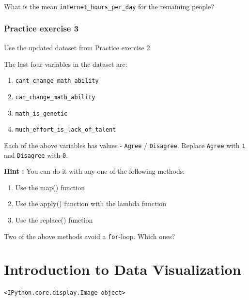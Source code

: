 \documentclass[
  letterpaper,
  DIV=11,
  numbers=noendperiod]{scrreprt}
\begin{document}
What is the mean \texttt{internet\_hours\_per\_day} for the remaining
people?

\hypertarget{practice-exercise-3-2}{%
\subsection{Practice exercise 3}\label{practice-exercise-3-2}}

\hypertarget{section-38}{%
\subsubsection{}\label{section-38}}

Use the updated dataset from Practice exercise 2.

The last four variables in the dataset are:

\begin{enumerate}
\def\labelenumi{\arabic{enumi}.}
\item
  \texttt{cant\_change\_math\_ability}
\item
  \texttt{can\_change\_math\_ability}
\item
  \texttt{math\_is\_genetic}
\item
  \texttt{much\_effort\_is\_lack\_of\_talent}
\end{enumerate}

Each of the above variables has values - \texttt{Agree} /
\texttt{Disagree}. Replace \texttt{Agree} with \texttt{1} and
\texttt{Disagree} with \texttt{0}.

\textbf{Hint :} You can do it with any one of the following methods:

\begin{enumerate}
\def\labelenumi{\arabic{enumi}.}
\item
  Use the map() function
\item
  Use the apply() function with the lambda function
\item
  Use the replace() function
\end{enumerate}

Two of the above methods avoid a \texttt{for}-loop. Which ones?

\hypertarget{introduction-to-data-visualization}{%
\chapter{Introduction to Data
Visualization}\label{introduction-to-data-visualization}}

\begin{verbatim}
<IPython.core.display.Image object>
\end{verbatim}
\end{document}

